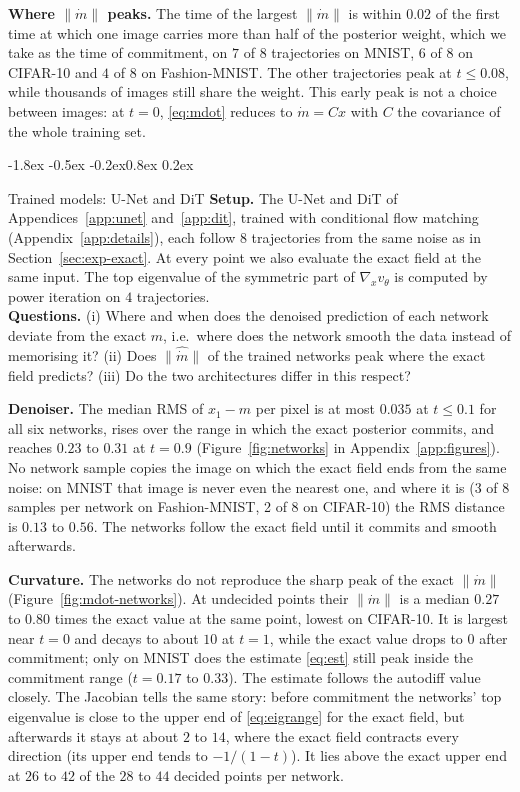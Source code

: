 \documentclass{article}
\makeatletter
\renewcommand{\normalsize}{\fontsize{10pt}{11pt}\selectfont}
\renewcommand{\subsection}{\@startsection{subsection}{2}{\z@}%
  {-1.8ex \@plus -0.5ex \@minus -0.2ex}{0.8ex \@plus 0.2ex}{\normalsize\bfseries\raggedright}}
\theoremstyle{remark}
\makeatother
\begin{document}
\textbf{Where $\|\dot m\|$ peaks.} The time of the largest $\|\dot m\|$ is within $0.02$ of the first time at which one image carries more than half of the posterior weight, which we take as the time of commitment, on $7$ of $8$ trajectories on MNIST, $6$ of $8$ on CIFAR-10 and $4$ of $8$ on Fashion-MNIST. The other trajectories peak at $t \le 0.08$, while thousands of images still share the weight. This early peak is not a choice between images: at $t = 0$, \eqref{eq:mdot} reduces to $\dot m = C x$ with $C$ the covariance of the whole training set.

\subsection{Trained models: U-Net and DiT}\label{sec:exp-networks}
\textbf{Setup.} The U-Net and DiT of Appendices~\ref{app:unet} and~\ref{app:dit}, trained with conditional flow matching (Appendix~\ref{app:details}), each follow $8$ trajectories from the same noise as in Section~\ref{sec:exp-exact}. At every point we also evaluate the exact field at the same input. The top eigenvalue of the symmetric part of $\nabla_x v_\theta$ is computed by power iteration on $4$ trajectories.\\
\textbf{Questions.} (i) Where and when does the denoised prediction of each network deviate from the exact $m$, i.e.\ where does the network smooth the data instead of memorising it? (ii) Does $\|\widehat{\dot m}\|$ of the trained networks peak where the exact field predicts? (iii) Do the two architectures differ in this respect?

\textbf{Denoiser.} The median RMS of $\hat x_1 - m$ per pixel is at most $0.035$ at $t \le 0.1$ for all six networks, rises over the range in which the exact posterior commits, and reaches $0.23$ to $0.31$ at $t = 0.9$ (Figure~\ref{fig:networks} in Appendix~\ref{app:figures}). No network sample copies the image on which the exact field ends from the same noise: on MNIST that image is never even the nearest one, and where it is (3 of 8 samples per network on Fashion-MNIST, 2 of 8 on CIFAR-10) the RMS distance is $0.13$ to $0.56$. The networks follow the exact field until it commits and smooth afterwards.

\textbf{Curvature.} The networks do not reproduce the sharp peak of the exact $\|\dot m\|$ (Figure~\ref{fig:mdot-networks}). At undecided points their $\|\dot m\|$ is a median $0.27$ to $0.80$ times the exact value at the same point, lowest on CIFAR-10. It is largest near $t = 0$ and decays to about $10$ at $t = 1$, while the exact value drops to $0$ after commitment; only on MNIST does the estimate \eqref{eq:est} still peak inside the commitment range ($t = 0.17$ to $0.33$). The estimate follows the autodiff value closely. The Jacobian tells the same story: before commitment the networks' top eigenvalue is close to the upper end of \eqref{eq:eigrange} for the exact field, but afterwards it stays at about $2$ to $14$, where the exact field contracts every direction (its upper end tends to $-1/(1 - t)$). It lies above the exact upper end at $26$ to $42$ of the $28$ to $44$ decided points per network.
\end{document}
